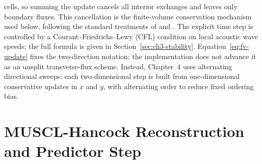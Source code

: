 cells, so summing the update cancels all interior exchanges and leaves only
boundary fluxes. This cancellation is the finite-volume conservation mechanism
used below, following the standard treatments of \citet{toro2009} and
\citet{leveque_2002}. The explicit time step is controlled by a
Courant--Friedrichs--Lewy (CFL) condition on local acoustic wave speeds; the
full formula is given in Section~\ref{sec:ch3-stability}.
Equation~\ref{eq:fv-update} fixes the
two-direction notation; the implementation does not advance it as an unsplit
transverse-flux scheme. Instead, Chapter~4 uses alternating directional sweeps:
each two-dimensional step is built from one-dimensional conservative updates in
\(x\) and \(y\), with alternating order to reduce fixed ordering bias.

\section{MUSCL-Hancock Reconstruction and Predictor Step}
